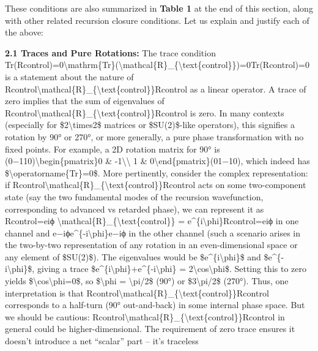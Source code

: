 \documentclass[]{article}
\begin{document}
These conditions are also summarized in \textbf{Table 1} at the end of
this section, along with other related recursion closure conditions. Let
us explain and justify each of the above:

\textbf{2.1 Traces and Pure Rotations:} The trace condition
Tr(Rcontrol)=0\textbackslash{}mathrm\{Tr\}(\textbackslash{}mathcal\{R\}\_\{\textbackslash{}text\{control\}\})=0Tr(Rcontrol​)=0
is a statement about the nature of
Rcontrol\textbackslash{}mathcal\{R\}\_\{\textbackslash{}text\{control\}\}Rcontrol​
as a linear operator. A trace of zero implies that the sum of
eigenvalues of
Rcontrol\textbackslash{}mathcal\{R\}\_\{\textbackslash{}text\{control\}\}Rcontrol​
is zero. In many contexts (especially for \$2\textbackslash{}times2\$
matrices or \$SU(2)\$-like operators), this signifies a rotation by 90°
or 270°, or more generally, a pure phase transformation with no fixed
points. For example, a 2D rotation matrix for 90° is
(0−110)\textbackslash{}begin\{pmatrix\}0 \&
-1\textbackslash{}\textbackslash{} 1 \&
0\textbackslash{}end\{pmatrix\}(01​−10​), which indeed has
\$\textbackslash{}operatorname\{Tr\}=0\$. More pertinently, consider the
complex representation: if
Rcontrol\textbackslash{}mathcal\{R\}\_\{\textbackslash{}text\{control\}\}Rcontrol​
acts on some two-component state (say the two fundamental modes of the
recursion wavefunction, corresponding to advanced vs retarded phase), we
can represent it as Rcontrol=eiϕ
\textbackslash{}mathcal\{R\}\_\{\textbackslash{}text\{control\}\} =
e\^{}\{i\textbackslash{}phi\}Rcontrol​=eiϕ in one channel and
e−iϕe\^{}\{-i\textbackslash{}phi\}e−iϕ in the other channel (such a
scenario arises in the two-by-two representation of any rotation in an
even-dimensional space or any element of \$SU(2)\$). The eigenvalues
would be \$e\^{}\{i\textbackslash{}phi\}\$ and
\$e\^{}\{-i\textbackslash{}phi\}\$, giving a trace
\$e\^{}\{i\textbackslash{}phi\}+e\^{}\{-i\textbackslash{}phi\} =
2\textbackslash{}cos\textbackslash{}phi\$. Setting this to zero yields
\$\textbackslash{}cos\textbackslash{}phi=0\$, so \$\textbackslash{}phi =
\textbackslash{}pi/2\$ (90°) or \$3\textbackslash{}pi/2\$ (270°). Thus,
one interpretation is that
Rcontrol\textbackslash{}mathcal\{R\}\_\{\textbackslash{}text\{control\}\}Rcontrol​
corresponds to a half-turn (90° out-and-back) in some internal phase
space. But we should be cautious:
Rcontrol\textbackslash{}mathcal\{R\}\_\{\textbackslash{}text\{control\}\}Rcontrol​
in general could be higher-dimensional. The requirement of zero trace
ensures it doesn't introduce a net ``scalar'' part -- it's traceless
\end{document}
